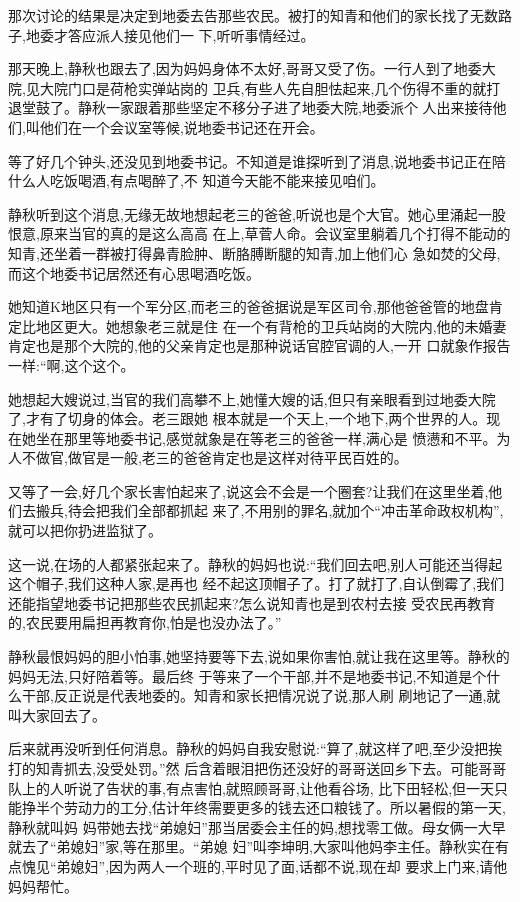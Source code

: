 ﻿\documentclass[12pt]{article}
\begin{document}
那次讨论的结果是决定到地委去告那些农民。被打的知青和他们的家长找了无数路子,地委才答应派人接见他们一
下,听听事情经过。

那天晚上,静秋也跟去了,因为妈妈身体不太好,哥哥又受了伤。一行人到了地委大院,见大院门口是荷枪实弹站岗的
卫兵,有些人先自胆怯起来,几个伤得不重的就打退堂鼓了。静秋一家跟着那些坚定不移分子进了地委大院,地委派个
人出来接待他们,叫他们在一个会议室等候,说地委书记还在开会。

等了好几个钟头,还没见到地委书记。不知道是谁探听到了消息,说地委书记正在陪什么人吃饭喝酒,有点喝醉了,不
知道今天能不能来接见咱们。

静秋听到这个消息,无缘无故地想起老三的爸爸,听说也是个大官。她心里涌起一股恨意,原来当官的真的是这么高高
在上,草菅人命。会议室里躺着几个打得不能动的知青,还坐着一群被打得鼻青脸肿、断胳膊断腿的知青,加上他们心
急如焚的父母,而这个地委书记居然还有心思喝酒吃饭。

她知道K地区只有一个军分区,而老三的爸爸据说是军区司令,那他爸爸管的地盘肯定比地区更大。她想象老三就是住
在一个有背枪的卫兵站岗的大院内,他的未婚妻肯定也是那个大院的,他的父亲肯定也是那种说话官腔官调的人,一开
口就象作报告一样:``啊,这个这个\myrule 。

她想起大嫂说过,当官的我们高攀不上,她懂大嫂的话,但只有亲眼看到过地委大院了,才有了切身的体会。老三跟她
根本就是一个天上,一个地下,两个世界的人。现在她坐在那里等地委书记,感觉就象是在等老三的爸爸一样,满心是
愤懑和不平。为人不做官,做官是一般,老三的爸爸肯定也是这样对待平民百姓的。

又等了一会,好几个家长害怕起来了,说这会不会是一个圈套?让我们在这里坐着,他们去搬兵,待会把我们全部都抓起
来了,不用别的罪名,就加个``冲击革命政权机构'',就可以把你扔进监狱了。

这一说,在场的人都紧张起来了。静秋的妈妈也说:``我们回去吧,别人可能还当得起这个帽子,我们这种人家,是再也
经不起这顶帽子了。打了就打了,自认倒霉了,我们还能指望地委书记把那些农民抓起来?怎么说知青也是到农村去接
受农民再教育的,农民要用扁担再教育你,怕是也没办法了。''

静秋最恨妈妈的胆小怕事,她坚持要等下去,说如果你害怕,就让我在这里等。静秋的妈妈无法,只好陪着等。最后终
于等来了一个干部,并不是地委书记,不知道是个什么干部,反正说是代表地委的。知青和家长把情况说了说,那人刷
刷地记了一通,就叫大家回去了。

后来就再没听到任何消息。静秋的妈妈自我安慰说:``算了,就这样了吧,至少没把挨打的知青抓去,没受处罚。''然
后含着眼泪把伤还没好的哥哥送回乡下去。可能哥哥队上的人听说了告状的事,有点害怕,就照顾哥哥,让他看谷场,
比下田轻松,但一天只能挣半个劳动力的工分,估计年终需要更多的钱去还口粮钱了。所以暑假的第一天,静秋就叫妈
妈带她去找``弟媳妇''那当居委会主任的妈,想找零工做。母女俩一大早就去了``弟媳妇''家,等在那里。``弟媳
妇''叫李坤明,大家叫他妈李主任。静秋实在有点愧见``弟媳妇'',因为两人一个班的,平时见了面,话都不说,现在却
要求上门来,请他妈妈帮忙。
\end{document}
